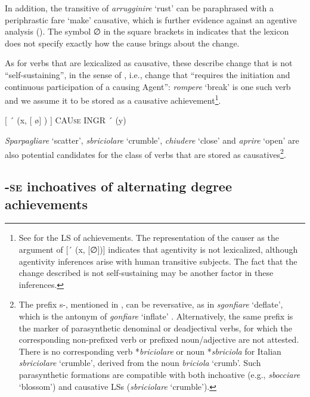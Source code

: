 \documentclass[output=paper,colorlinks,citecolor=brown
]{langscibook}
\begin{document}
In addition, the transitive of \textit{arrugginire} ‘rust’ can be paraphrased with a periphrastic fare ‘make’ causative, which is further evidence against an agentive analysis (). The symbol ∅ in the square brackets in  indicates that the lexicon does not specify exactly how the cause brings about the change.

As for verbs that are lexicalized as causative, these describe change that is not “self-sustaining”, in the sense of \citet[496]{kiparsky1997remarks}, i.e., change that “requires the initiation and continuous participation of a causing Agent”: \textit{rompere} ‘break’ is one such verb and we assume it to be stored as a causative achievement\footnote{See \citet[114]{vanvalin2023principles} for the LS of achievements. The representation of the causer as the argument of [´ (x, [∅])] indicates  that agentivity is not lexicalized, although agentivity inferences arise with human transitive subjects. The fact that the change described is not self-sustaining may be another factor in these inferences.}. 

\ea \label{bentley_example_47}
    $\lbrack$ ´ (x, $\lbrack$ \o $\rbrack$ ) $\rbrack$ CAU\textsc{se} INGR ´ (y)
\z

\textit{Sparpagliare} ‘scatter’, \textit{sbriciolare} ‘crumble’, \textit{chiudere} ‘close’ and \textit{aprire} ‘open’ are also potential candidates for the class of verbs that are stored as causatives\footnote{The prefix s-, mentioned in , can be reversative, as in \textit{sgonfiare} ‘deflate’, which is the antonym of \textit{gonfiare} ‘inflate’ \citep{iacobini2004prefissazione}. Alternatively, the same prefix is the marker of parasynthetic denominal or deadjectival verbs, for which the corresponding non-prefixed verb or prefixed noun/adjective are not attested. There is no corresponding verb *\textit{briciolare} or noun *\textit{sbriciola} for Italian \textit{sbriciolare} ‘crumble’, derived from the noun \textit{briciola} ‘crumb’. Such parasynthetic formations are compatible with both inchoative (e.g., \textit{sbocciare} ‘blossom’) and causative LSs (\textit{sbriciolare} ‘crumble’).}. 

\subsection{-\textsc{se} inchoatives of alternating degree achievements}
\label{bentley_section_5.3}
\end{document}
